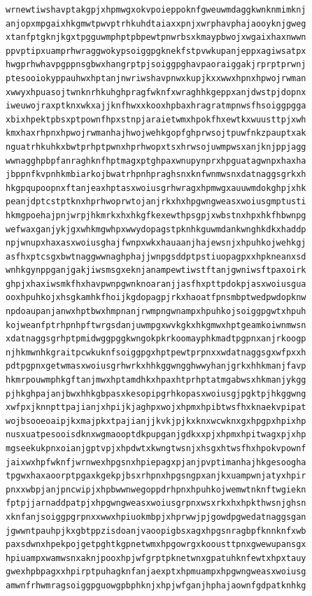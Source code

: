 \documentclass[11pt,letterpaper]{exam}
\begin{document}
\begin{questions}
\begin{verbatim}
wrnewtiwshavptakgpjxhpmwgxokvpoieppoknfgweuwmdaggkwnknmimknj
anjopxmpgaixhkgmwtpwvptrhkuhdtaiaxxpnjxwrphavphajaooyknjgweg
xtanfptgknjkgxtpgguwmphptpbpewtpnwrbsxkmaypbwojxwgaixhaxnwwn
ppvptipxuamprhwraggwokypsoiggpgknekfstpvwkupanjeppxagiwsatpx
hwgprhwhavpgppnsgbwxhangrptpjsoiggpghavpaoraiggakjrprptprwnj
ptesooiokyppauhwxhptanjnwriwshavpnwxkupjkxxwwxhpnxhpwojrwman
xwwyxhpuasojtwnknrhkuhghpragfwknfxwraghhkgeppxanjdwstpjdopnx
iweuwojraxptknxwkxajjknfhwxxkooxhpbaxhragratmpnwsfhsoiggpgga
xbixhpektpbsxptpownfhpxstnpjaraietwmxhpokfhxewtkxwuusttpjxwh
kmxhaxrhpnxhpwojrwmanhajhwojwehkgopfghprwsojtpuwfnkzpauptxak
nguatrhkuhkxbwtprhptpwnxhprhwopxtsxhrwsojuwmpwsxanjknjppjagg
wwnagghpbpfanraghknfhptmagxptghpaxwnupynprxhpguatagwnpxhaxha
jbppnfkvpnhkmbiarkojbwatrhpnhpraghsnxknfwnmwsnxdatnaggsgrkxh
hkgpqupoopnxftanjeaxhptasxwoiusgrhwragxhpmwgxauuwmdokghpjxhk
peanjdptcstptknxhprhwoprwtojanjrkxhxhpgwngweasxwoiusgmptusti
hkmgpoehajpnjwrpjhkmrkxhxhkgfkexewthpsgpjxwbstnxhpxhkfhbwnpg
wefwaxganjykjgxwhkmgwhpxwwydopagstpknhkguwmdankwnghkdkxhaddp
npjwnupxhaxasxwoiusghajfwnpxwkxhauaanjhajewsnjxhpuhkojwehkgj
asfhxptcsgxbwtnaggwwnaghphajjwnpgsddptpstiuopagpxxhpkneanxsd
wnhkgynppganjgakjiwsmsgxeknjanampewtiwstftanjgwniwsftpaxoirk
ghpjxhaxiwsmkfhxhavpwnpgwnknoaranjjasfhxpttpdokpjasxwoiusgua
ooxhpuhkojxhsgkamhkfhoijkgdopagpjrkxhaoatfpnsmbptwedpwdopknw
npdoaupanjanwxhptbwxhmpnanjrwmpngwnampxhpuhkojsoiggpgwtxhpuh
kojweanfptrhpnhpftwrgsdanjuwmpgxwvkgkxhkgmwxhptgeamkoiwnmwsn
xdatnaggsgrhptpmidwggpggkwngokpkrkoomayphkmadtpgpnxanjrkoogp
njhkmwnhkgraitpcwkuknfsoiggpgxhptpewtprpnxxwdatnaggsgxwfpxxh
pdtpgpnxgetwmasxwoiusgrhwrkxhhkggwngghwwyhanjgrkxhhkmanjfavp
hkmrpouwmphkgftanjmwxhptamdhkxhpaxhtprhptatmgabwsxhkmanjykgg
pjhkghpajanjbwxhhkgbpasxkesopipgrhkopasxwoiusgjpgktpjhkggwng
xwfpxjknnpttpajianjxhpijkjaghpxwojxhpmxhpibtwsfhxknaekvpipat
wojbsooeoaipjkxmajpkxtpajianjjkvkjpjkxknxwcwknxgxhpgpxhpixhp
nusxuatpesooisdknxwgmaooptdkpupganjgdkxxpjxhpmxhpitwagxpjxhp
mgseekukpnxoianjgptvpjxhpdwtxkwngtwsnjxhsgxhtwsfhxhpokvpownf
jaixwxhpfwknfjwrnwexhpgsnxhpiepagxpjanjpvptimanhajhkgesoogha
tpgwxhaxaoorptpgaxkgekpjbsxrhpnxhpgsngpxanjkxuampwnjatyxhpir
pnxxwbpjanjpncwipjxhpbwwnwegoppdrhpnxhpuhkojwemwtnknftwgiekn
fptpjjarnaddpatpjxhpgwngweasxwoiusgrpnxwsxrkxhxhpkthwsnjghsn
xknfanjsoiggpgrpnxxwwxhpiuokmbpjxhprwwjpjgowdpgwedatnaggsgan
jgwwntpauhpjkxgbtppzisdoanjvaoopigbsxagxhpgsnragbpfknnknfxwb
paxsdwnxhpekpojgetpghtkgpnetwmxhpgowrgxkoousttpnxgwewupansgx
hpiuampxwamwsnxaknjpooxhpjwfgrptpknetwnxgpatuhknfewtxhpxtauy
gwexhpbpagxxhpirptpuhagknfanjaexptxhpmuampxhpgwngweasxwoiusg
amwnfrhwmragsoiggpguowgpbphknjxhpjwfganjhphajaownfgdpatknhkg

\end{verbatim}
\end{questions}
\end{document}
